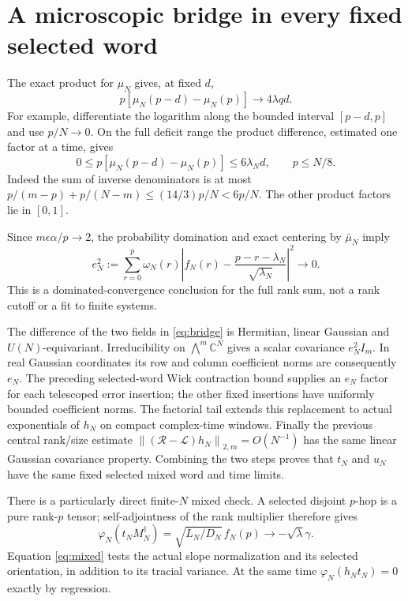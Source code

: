 \documentclass[11pt]{article}
\newcommand{\norm}[1]{\left\lVert#1\right\rVert}
\begin{document}
\newpage
\section{A microscopic bridge in every fixed selected word}
The exact product for $\mu_N$ gives, at fixed $d$,
\begin{equation}
 p[\mu_N(p-d)-\mu_N(p)]\longrightarrow4\lambda qd.
\end{equation}
For example, differentiate the logarithm along the bounded interval
$[p-d,p]$ and use $p/N\to0$. On the full deficit range the product
difference, estimated one factor at a time, gives
\begin{equation}
 0\le p[\mu_N(p-d)-\mu_N(p)]\le6\lambda_N d,
 \qquad p\le N/8.
\end{equation}
Indeed the sum of inverse denominators is at most
$p/(m-p)+p/(N-m)\le(14/3)p/N<6p/N$.
The other product factors lie in $[0,1]$.

Since $m\epsilon\alpha/p\to2$, the probability domination and
exact centering by $\bar\mu_N$ imply
\begin{equation}\label{eq:bridge}
 e_N^2:=\sum_{r=0}^p\omega_N(r)
 \left|f_N(r)-\frac{p-r-\lambda_N}{\sqrt{\lambda_N}}\right|^2
 \longrightarrow0.
\end{equation}
This is a dominated-convergence conclusion for the full rank sum,
not a rank cutoff or a fit to finite systems.

The difference of the two fields in \eqref{eq:bridge} is Hermitian,
linear Gaussian and $U(N)$-equivariant. Irreducibility on
$\bigwedge^m\mathbb C^N$ gives a scalar covariance $e_N^2 I_m$.
In real Gaussian coordinates its row and column coefficient norms
are consequently $e_N$. The preceding selected-word Wick contraction
bound supplies an $e_N$ factor for each telescoped error insertion;
the other fixed insertions have uniformly bounded coefficient norms.
The factorial tail extends this replacement to actual exponentials
of $h_N$ on compact complex-time windows. Finally the previous
central rank/size estimate
$\norm{(\mathcal R-\mathcal L)h_N}_{2,m}=O(N^{-1})$
has the same linear Gaussian covariance property. Combining the two
steps proves that $t_N$ and $u_N$ have the same fixed selected mixed
word and time limits.

There is a particularly direct finite-$N$ mixed check. A selected
disjoint $p$-hop is a pure rank-$p$ tensor; self-adjointness of the
rank multiplier therefore gives
\begin{equation}\label{eq:mixed}
 \varphi_N(t_N M_N^\dagger)
   =\sqrt{L_N/D_N}\,f_N(p)
   \longrightarrow-\sqrt\lambda\gamma.
\end{equation}
Equation \eqref{eq:mixed} tests the actual slope normalization and
its selected orientation, in addition to its tracial variance.
At the same time $\varphi_N(h_Nt_N)=0$ exactly by regression.
\end{document}
